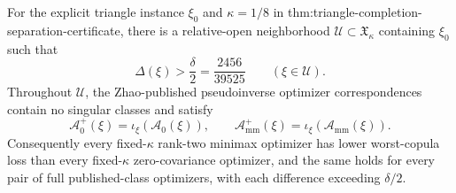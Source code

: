 For the explicit triangle instance \(\xi_0\) and \(\kappa=1/8\) in thm:triangle-completion-separation-certificate, there is a relative-open neighborhood \(\mathcal U\subset\mathfrak X_\kappa\) containing \(\xi_0\) such that
\[
\Delta(\xi)>\frac{\delta}{2}=\frac{2456}{39525}
\qquad(\xi\in\mathcal U).
\]
Throughout \(\mathcal U\), the Zhao-published pseudoinverse optimizer correspondences contain no singular classes and satisfy
\[
\mathcal A_0^+(\xi)=\iota_\xi(\mathcal A_0(\xi)),
\qquad
\mathcal A_{\mathrm{mm}}^+(\xi)=\iota_\xi(\mathcal A_{\mathrm{mm}}(\xi)).
\]
Consequently every fixed-\(\kappa\) rank-two minimax optimizer has lower worst-copula loss than every fixed-\(\kappa\) zero-covariance optimizer, and the same holds for every pair of full published-class optimizers, with each difference exceeding \(\delta/2\).
